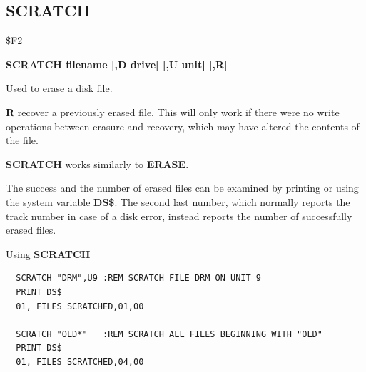 \subsection{SCRATCH}
\begin{description}[leftmargin=2cm,style=nextline]
\item [Token:] \$F2
\item [Format:] {\bf SCRATCH filename [,D drive] [,U unit] [,R]}
\item [Usage:] Used to erase a disk file.

   \filenamedefinition

   \drivedefinition

   \unitdefinition

   {\bf R} recover a previously erased file.
   This will only work if there were no write operations
   between erasure and recovery, which may have altered the
   contents of the file.

\item [Remarks:] {\bf SCRATCH} works similarly to
                 {\bf ERASE}.

                 The success and the number of erased files can
                 be examined by printing or using the system
                 variable {\bf DS\$}. The second last number, which
                 normally reports the track number in case of a disk error,
                 instead reports the number of successfully erased files.

\item [Examples:] Using {\bf SCRATCH}
\begin{tcolorbox}[colback=black,coltext=white]
\verbatimfont{\codefont}
\begin{verbatim}
  SCRATCH "DRM",U9 :REM SCRATCH FILE DRM ON UNIT 9
  PRINT DS$
  01, FILES SCRATCHED,01,00

  SCRATCH "OLD*"   :REM SCRATCH ALL FILES BEGINNING WITH "OLD"
  PRINT DS$
  01, FILES SCRATCHED,04,00
\end{verbatim}
\end{tcolorbox}
\end{description}


\newpage
